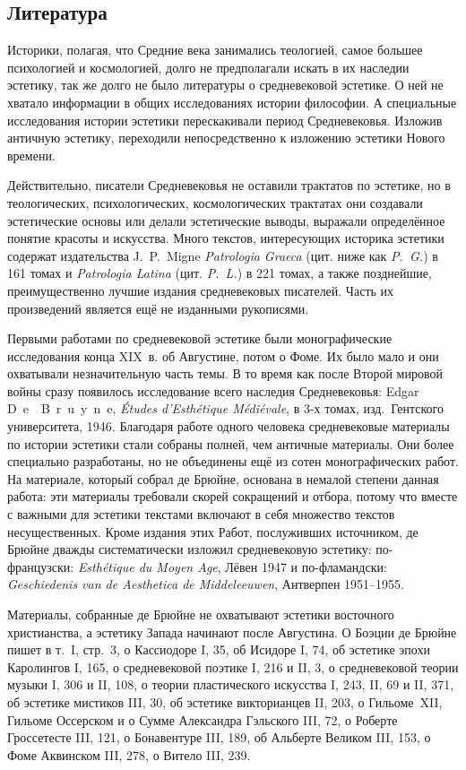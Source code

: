 \subsection*{Литература}
Историки, полагая, что Средние века занимались теологией, самое большее психологией и космологией, долго не предполагали искать в их наследии эстетику, так же долго не было литературы о средневековой эстетике. О ней не хватало информации в общих исследованиях истории философии. А специальные исследования истории эстетики перескакивали период Средневековья. Изложив античную эстетику, переходили непосредственно к изложению эстетики Нового времени.

Действительно, писатели Средневековья не оставили трактатов по эстетике, но в теологических, психологических, космологических трактатах они создавали эстетические основы или делали эстетические выводы, выражали определённое понятие красоты и искусства. Много текстов, интересующих историка эстетики содержат издательства J.~P.~Migne \textit{Patrologia Graeca} (цит. ниже как \textit{P.~G.}) в 161 томах и \textit{Patrologia Latina} (цит. \textit{P.~L.}) в 221 томах, а также позднейшие, преимущественно лучшие издания средневековых писателей. Часть их произведений является ещё не изданными рукописями.

Первыми работами по средневековой эстетике были монографические исследования конца XIX~в. об Августине, потом о Фоме. Их было мало и они охватывали незначительную часть темы. В то время как после Второй мировой войны сразу появилось исследование всего наследия Средневековья: Edgar  D~e~~B~r~u~y~n~e,  \textit{Études d’Esthétique Médiévale}, в 3-х томах, изд.~Гентского университета, 1946. Благодаря работе одного человека средневековые материалы по истории эстетики стали собраны полней, чем античные материалы. Они более специально разработаны, но не объединены ещё из сотен монографических работ. На материале, который собрал де Брюйне, основана в немалой степени данная работа: эти материалы требовали скорей сокращений и отбора, потому что вместе с важными для эстетики текстами включают в себя множество текстов несущественных. Кроме издания этих Работ, послуживших источником, де Брюйне дважды систематически изложил средневековую эстетику: по-французски: \textit{Esthétique du Moyen Age}, Лёвен 1947 и по-фламандски: \textit{Geschiedenis van de Aesthetica de Middeleeuwen}, Антверпен 1951--1955.

Материалы, собранные де Брюйне не охватывают эстетики восточного христианства, а эстетику Запада начинают после Августина. О Боэции де Брюйне пишет в т.~I, стр.~3, о Кассиодоре I, 35, об Исидоре I, 74, об эстетике эпохи Каролингов I, 165, о средневековой поэтике I, 216 и II, 3, о средневековой теории музыки I, 306 и II, 108, о теории пластического искусства I, 243, II, 69 и II, 371, об эстетике мистиков III, 30, об эстетике викторианцев II, 203, о Гильоме~XII, Гильоме Оссерском и о Сумме Александра Гэльского III, 72, о Роберте Гроссетесте III, 121, о Бонавентуре III, 189, об Альберте Великом III, 153, о Фоме Аквинском III, 278, о Витело III, 239.

